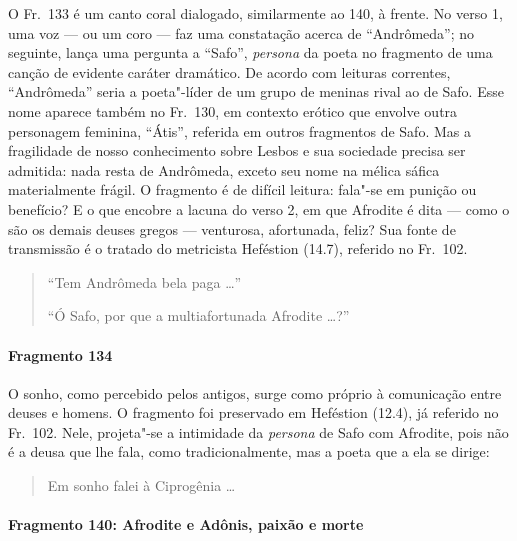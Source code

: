 {\small O Fr.~133 é um canto coral dialogado, similarmente ao 140, à frente. No verso 1, uma voz --- ou um coro --- faz uma constatação acerca de ``Andrômeda”; no seguinte,
lança uma pergunta a ``Safo”, \textit{persona }da poeta no fragmento de
uma canção de evidente caráter dramático. De acordo com leituras correntes,
``Andrômeda” seria a poeta"-líder de um grupo de
meninas rival ao de Safo. Esse nome aparece também no Fr.~130, em contexto
erótico que envolve outra personagem feminina, “Átis”, referida em
outros fragmentos de Safo. Mas a fragilidade de nosso conhecimento sobre Lesbos
e sua sociedade precisa ser admitida: nada resta de Andrômeda, exceto seu nome
na mélica sáfica materialmente frágil. O fragmento é de difícil leitura:
fala"-se em punição ou benefício? E o que encobre a lacuna do verso 2, em que
Afrodite é dita --- como o são os demais deuses gregos --- venturosa, afortunada,
feliz? Sua fonte de transmissão é o tratado do metricista Heféstion (14.7), referido
no Fr.~102.}

\begin{verse}
“Tem Andrômeda bela paga \ldots{}”

“Ó Safo, por que a multiafortunada \qb{}Afrodite \ldots{}?”
\end{verse}

\paragraph{Fragmento 134}

{\small O sonho, como percebido pelos antigos, surge como próprio à
comunicação entre deuses e homens. O fragmento foi preservado em Heféstion (12.4), já
referido no Fr.~102. Nele, projeta"-se a intimidade da \textit{persona} de Safo com Afrodite, pois não é a deusa que lhe fala, como tradicionalmente, mas a poeta que a ela se dirige:}

\begin{verse}
Em sonho falei à Ciprogênia \ldots{}
\end{verse}

\paragraph{Fragmento 140: Afrodite e Adônis, paixão e morte}

